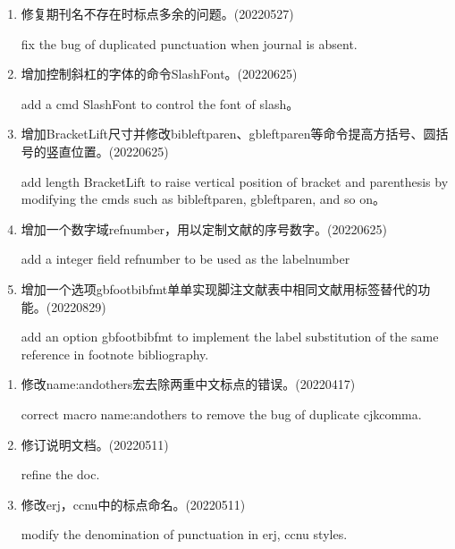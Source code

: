 \label{up:20220829}
\begin{enumerate}

\item 修复期刊名不存在时标点多余的问题。(20220527)

fix the bug of duplicated punctuation when journal is absent.

\item 增加控制斜杠的字体的命令SlashFont。(20220625)

add a cmd SlashFont to control the font of slash。


\item 增加BracketLift尺寸并修改bibleftparen、gbleftparen等命令提高方括号、圆括号的竖直位置。(20220625)

add length BracketLift to raise vertical position of bracket and parenthesis by modifying the cmds such as bibleftparen, gbleftparen, and so on。


\item 增加一个数字域refnumber，用以定制文献的序号数字。(20220625)

add a integer field refnumber to be used as the labelnumber

\item 增加一个选项gbfootbibfmt单单实现脚注文献表中相同文献用标签替代的功能。(20220829)

add an option gbfootbibfmt to implement the label substitution of the same reference in footnote bibliography.

\end{enumerate}



\label{up:20220517}
\begin{enumerate}

\item 修改name:andothers宏去除两重中文标点的错误。(20220417)

correct macro name:andothers to remove the bug of duplicate cjkcomma.

\item 修订说明文档。(20220511)

refine the doc.

\item 修改erj，ccnu中的标点命名。(20220511)

modify the denomination of punctuation in erj, ccnu styles.

\end{enumerate}

